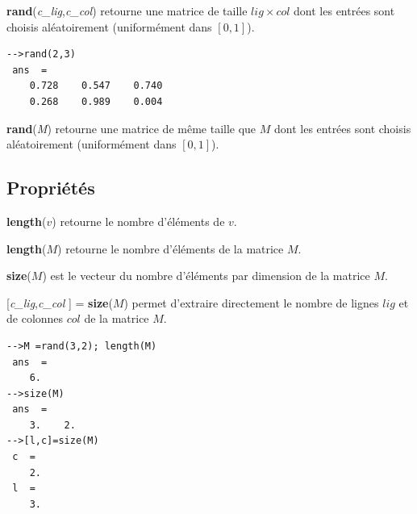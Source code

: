 \documentclass{article}
\begin{document}
\begin{multicols}{3}
\begin{description}
\item{\textbf{rand}(\textit{c\_lig},\textit{c\_col})} retourne une matrice de taille $lig \times col$ dont les entrées sont choisis aléatoirement (uniformément dans $[0,1]$).
\begin{verbatim}
-->rand(2,3)
 ans  =
    0.728    0.547    0.740  
    0.268    0.989    0.004 
\end{verbatim}
\item{\textbf{rand}(\textit{M})} retourne une matrice de même taille que $M$ dont les entrées sont choisis aléatoirement (uniformément dans $[0,1]$).

\end{description}
\subsection{Propriétés}
\begin{description}
\item{\textbf{length}($v$)} retourne le nombre d'éléments de $v$.
\item{\textbf{length}($M$)} retourne le nombre d'éléments de la matrice $M$.
\item{\textbf{size}($M$)} est le vecteur du nombre d'éléments par dimension de la matrice $M$.
\item{[\textit{c\_lig},\textit{c\_col} ] = \textbf{size}($M$)} permet d'extraire directement le nombre de lignes $lig$ et de colonnes $col$ de la matrice $M$.
\begin{verbatim}
-->M =rand(3,2); length(M)
 ans  =
    6.  
-->size(M)
 ans  =
    3.    2.  
-->[l,c]=size(M)
 c  =
    2.  
 l  =
    3.
\end{verbatim}
\end{description}

\end{multicols}
\end{document}

